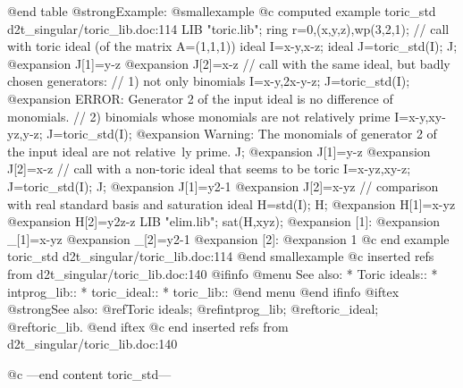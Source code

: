@end table
@strong{Example:}
@smallexample
@c computed example toric_std d2t_singular/toric_lib.doc:114 
LIB "toric.lib";
ring r=0,(x,y,z),wp(3,2,1);
// call with toric ideal (of the matrix A=(1,1,1))
ideal I=x-y,x-z;
ideal J=toric_std(I);
J;
@expansion{} J[1]=y-z
@expansion{} J[2]=x-z
// call with the same ideal, but badly chosen generators:
// 1) not only binomials
I=x-y,2x-y-z;
J=toric_std(I);
@expansion{} ERROR: Generator 2 of the input ideal is no difference of monomials.
// 2) binomials whose monomials are not relatively prime
I=x-y,xy-yz,y-z;
J=toric_std(I);
@expansion{} Warning: The monomials of generator 2 of the input ideal are not relative\
   ly prime.
J;
@expansion{} J[1]=y-z
@expansion{} J[2]=x-z
// call with a non-toric ideal that seems to be toric
I=x-yz,xy-z;
J=toric_std(I);
J;
@expansion{} J[1]=y2-1
@expansion{} J[2]=x-yz
// comparison with real standard basis and saturation
ideal H=std(I);
H;
@expansion{} H[1]=x-yz
@expansion{} H[2]=y2z-z
LIB "elim.lib";
sat(H,xyz);
@expansion{} [1]:
@expansion{}    _[1]=x-yz
@expansion{}    _[2]=y2-1
@expansion{} [2]:
@expansion{}    1
@c end example toric_std d2t_singular/toric_lib.doc:114
@end smallexample
@c inserted refs from d2t_singular/toric_lib.doc:140
@ifinfo
@menu
See also:
* Toric ideals::
* intprog_lib::
* toric_ideal::
* toric_lib::
@end menu
@end ifinfo
@iftex
@strong{See also:}
@ref{Toric ideals};
@ref{intprog_lib};
@ref{toric_ideal};
@ref{toric_lib}.
@end iftex
@c end inserted refs from d2t_singular/toric_lib.doc:140

@c ---end content toric_std---
